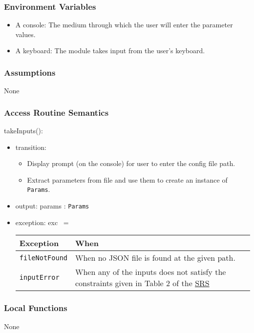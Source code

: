 \documentclass[12pt, titlepage]{article}
\begin{document}
\subsubsection{Environment Variables}
\begin{itemize}
  \item A console: The medium through which the user will enter the parameter values. 
  \item A keyboard: The module takes input from the user's keyboard. 
\end{itemize}

\subsubsection{Assumptions}
None 

\subsubsection{Access Routine Semantics}

\noindent takeInputs():
\begin{itemize}
\item transition: 
\begin{itemize}
  \item Display prompt (on the console) for user to enter the config file path. 
  \item Extract parameters from file and use them to create an instance of \texttt{Params}.
\end{itemize} 
\item output: params : \texttt{Params} 
\item exception: exc $\:=$
\begin{center}
  \begin{tabular}{p{5cm} p{4cm}}
  \hline
  \textbf{Exception} & \textbf{When} \\
  \hline
  \texttt{fileNotFound} & When no JSON file is found at the given path.  \\
  \hline
  \texttt{inputError} & When any of the inputs does not satisfy the constraints given in Table 2 of the \href{https://github.com/husseinsd1/optimal-em-arrangement/blob/main/docs/SRS/SRS.pdf}{SRS}  \\
  \hline
  \end{tabular}
  \end{center}
\end{itemize}

\subsubsection{Local Functions}
None
\end{document}

